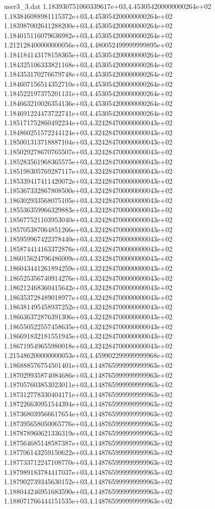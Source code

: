 \begin{filecontents}{user3_3.dat}
1.183930751060339617e+03,4.453054200000000264e+02
1.183846088981115372e+03,4.453054200000000264e+02
1.183987002641288200e+03,4.453054200000000264e+02
1.184015116079636982e+03,4.453054200000000264e+02
1.212128400000000056e+03,4.480052499999999895e+02
1.184184143178158365e+03,4.453054200000000264e+02
1.184325106333821168e+03,4.453054200000000264e+02
1.184353170276679748e+03,4.453054200000000264e+02
1.184607156514352710e+03,4.453054200000000264e+02
1.184522197375201131e+03,4.453054200000000264e+02
1.184663210026354136e+03,4.453054200000000264e+02
1.184691224473722741e+03,4.453054200000000264e+02
1.185171752860492234e+03,4.324284700000000043e+02
1.184860251572244124e+03,4.324284700000000043e+02
1.185001313718887104e+03,4.324284700000000043e+02
1.185029278670765507e+03,4.324284700000000043e+02
1.185283561968365575e+03,4.324284700000000043e+02
1.185198305769287117e+03,4.324284700000000043e+02
1.185339417411420072e+03,4.324284700000000043e+02
1.185367332867808500e+03,4.324284700000000043e+02
1.186302933568075105e+03,4.324284700000000043e+02
1.185536359966329883e+03,4.324284700000000043e+02
1.185677521103953040e+03,4.324284700000000043e+02
1.185705387064851266e+03,4.324284700000000043e+02
1.185959967422378440e+03,4.324284700000000043e+02
1.185874414163372876e+03,4.324284700000000043e+02
1.186015624796486009e+03,4.324284700000000043e+02
1.186043441261894259e+03,4.324284700000000043e+02
1.186525356740914276e+03,4.324284700000000043e+02
1.186212468360415642e+03,4.324284700000000043e+02
1.186353728489018977e+03,4.324284700000000043e+02
1.186381495458937252e+03,4.324284700000000043e+02
1.186636372876391306e+03,4.324284700000000043e+02
1.186550522557458635e+03,4.324284700000000043e+02
1.186691832181551945e+03,4.324284700000000043e+02
1.186719549655980018e+03,4.324284700000000043e+02
1.215486200000000053e+03,4.459902299999999968e+02
1.186888576754501401e+03,4.148765999999999963e+02
1.187029935874084686e+03,4.148765999999999963e+02
1.187057603853023011e+03,4.148765999999999963e+02
1.187312778330404171e+03,4.148765999999999963e+02
1.187226630951544394e+03,4.148765999999999963e+02
1.187368039566617654e+03,4.148765999999999963e+02
1.187395658050065776e+03,4.148765999999999963e+02
1.187878960621336319e+03,4.148765999999999963e+02
1.187564685148587387e+03,4.148765999999999963e+02
1.187706143259150622e+03,4.148765999999999963e+02
1.187733712247108770e+03,4.148765999999999963e+02
1.187989183784417037e+03,4.148765999999999963e+02
1.187902739345630152e+03,4.148765999999999963e+02
1.188044246951683590e+03,4.148765999999999963e+02
1.188071766444151535e+03,4.148765999999999963e+02

\end{filecontents}
